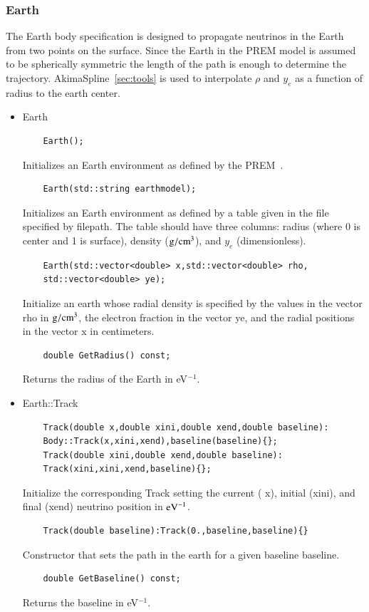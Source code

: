 \documentclass[3p,12pt]{elsarticle}
\newcommand{\ttf}{\ttfamily}
\begin{document}
\subsubsection{Earth \label{sec:earth}}
The {\ttf Earth} body specification is designed to propagate neutrinos
in the Earth from two points on the surface. Since the Earth in the
PREM model is assumed to be spherically symmetric the length of the
path is enough to determine the trajectory. {\ttfamily AkimaSpline}~\ref{sec:tools} is used to interpolate $\rho$ and $y_e$ as a function of radius to the earth center.
\begin{itemize}
\item {\ttf Earth}
  \begin{lstlisting}
    Earth();
  \end{lstlisting}
  Initializes an {\ttf Earth} environment as defined by the PREM~\citep{dziewonski1981preliminary}.
  \begin{lstlisting}
    Earth(std::string earthmodel);
  \end{lstlisting}
  Initializes an {\ttf Earth} environment as defined by a table given in the file specified by {\ttf filepath}. The table should have three columns: radius (where 0 is center and 1 is surface), density (${\rm g}/{\rm cm}^3$), and $y_e$ (dimensionless). 
  \begin{lstlisting}
    Earth(std::vector<double> x,std::vector<double> rho,
    std::vector<double> ye);
  \end{lstlisting}
  Initialize an {\ttf earth} whose radial density is specified by the
  values in the vector {\ttf rho} in ${\rm g}/{\rm cm}^3$, the
  electron fraction in the vector {\ttf ye}, and the radial positions
  in the vector {\ttf x} in centimeters. 

  \begin{lstlisting}
    double GetRadius() const;
  \end{lstlisting}
  Returns the radius of the Earth in eV$^{-1}$.

\item {\ttf Earth::Track}
  \begin{lstlisting}
    Track(double x,double xini,double xend,double baseline):
    Body::Track(x,xini,xend),baseline(baseline){};
    Track(double xini,double xend,double baseline):
    Track(xini,xini,xend,baseline){};
  \end{lstlisting}
  Initialize the corresponding {\ttf Track} setting the current ({\ttf
    x}), initial ({\ttf xini}), and final ({\ttf xend}) neutrino position in ${\rm eV}^{-1}$.
  
  \begin{lstlisting}
    Track(double baseline):Track(0.,baseline,baseline){}
  \end{lstlisting}
  Constructor that sets the path in the earth for a given baseline
  {\ttf baseline}.

  \begin{lstlisting}
    double GetBaseline() const;
  \end{lstlisting}
  Returns the baseline in eV$^{-1}$.
    
\end{itemize}
\end{document}
